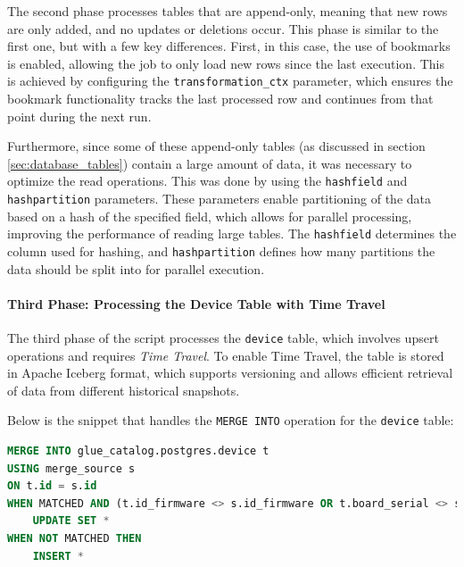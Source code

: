 The second phase processes tables that are append-only, meaning that new rows are only added, and no updates or deletions occur. This phase is similar to the first one, but with a few key differences. First, in this case, the use of bookmarks is enabled, allowing the job to only load new rows since the last execution. This is achieved by configuring the \texttt{transformation\_ctx} parameter, which ensures the bookmark functionality tracks the last processed row and continues from that point during the next run.

Furthermore, since some of these append-only tables (as discussed in section \ref{sec:database_tables}) contain a large amount of data, it was necessary to optimize the read operations. This was done by using the \texttt{hashfield} and \texttt{hashpartition} parameters. These parameters enable partitioning of the data based on a hash of the specified field, which allows for parallel processing, improving the performance of reading large tables. The \texttt{hashfield} determines the column used for hashing, and \texttt{hashpartition} defines how many partitions the data should be split into for parallel execution.

\paragraph{Third Phase: Processing the Device Table with Time Travel}

The third phase of the script processes the \texttt{device} table, which involves upsert operations and requires \textit{Time Travel}. To enable Time Travel, the table is stored in Apache Iceberg format, which supports versioning and allows efficient retrieval of data from different historical snapshots.

Below is the snippet that handles the \texttt{MERGE INTO} operation for the \texttt{device} table:

\begin{lstlisting}[language=SQL, caption=MERGE INTO for Postgres extraction]
MERGE INTO glue_catalog.postgres.device t
USING merge_source s
ON t.id = s.id
WHEN MATCHED AND (t.id_firmware <> s.id_firmware OR t.board_serial <> s.board_serial OR t.id_board_model <> s.id_board_model OR t.last_ip <> s.last_ip OR t.city <> s.city OR t.connection_kind <> s.connection_kind OR t.bridge_firm <> s.bridge_firm OR t.cloud_pin <> s.cloud_pin OR t.mirror <> s.mirror) THEN
    UPDATE SET *
WHEN NOT MATCHED THEN
    INSERT *
\end{lstlisting}

